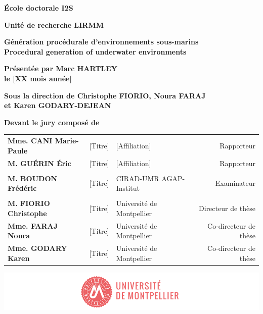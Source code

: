 \begin{titlepage}
{		\bigskip
		\textbf{École doctorale I2S}
		
		\bigskip
		\textbf{Unité de recherche LIRMM}
		
		
		\color{Titleblue}
		\fontsize{17}{20.4}\selectfont
		\vspace{2cm}
		\textbf{Génération procédurale d'environnements sous-marins\\Procedural generation of underwater environments}
		
		
		\vspace{4cm}
		\fontsize{15}{18}\selectfont
		\color{black}
		\textbf{Présentée par Marc HARTLEY \\
			le [XX mois année]}
		
		\bigskip
		\fontsize{13}{15.6}\selectfont
		\textbf{Sous la direction de Christophe FIORIO, 
			Noura FARAJ \\
			et Karen GODARY-DEJEAN}
		
		\vspace{1.5cm}
		\normalsize
		\textbf{Devant le jury composé de}\\
		\bigskip
		\fontsize{10}{12}\selectfont
		\vspace{1.5mm}
		\begin{tabularx}{\textwidth}{l l X r}
			\textbf{Mme. CANI Marie-Paule} & [Titre] & [Affiliation] & Rapporteur \\
			\textbf{M. GUÉRIN Éric} & [Titre] & [Affiliation] & Rapporteur \\
			\\
			\textbf{M. BOUDON Frédéric} & [Titre] & CIRAD-UMR AGAP-Institut & Examinateur \\
			\\
			\textbf{M. FIORIO Christophe} & [Titre] & Université de Montpellier & Directeur de thèse \\
			\textbf{Mme. FARAJ Noura} & [Titre] & Université de Montpellier & Co-directeur de thèse \\
			\textbf{Mme. GODARY Karen} & [Titre] & Université de Montpellier & Co-directeur de thèse \\
		\end{tabularx} 
		
		\vspace{\fill}
		\includegraphics[scale=1]{images/PhD_Couverture_LogoUM.png}
		\vspace{-15mm}}
\end{titlepage}

